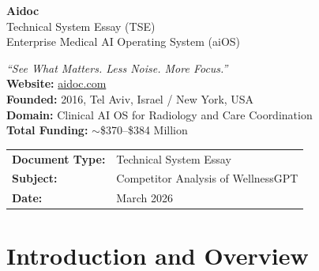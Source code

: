 \documentclass[12pt,a4paper]{article}
\begin{document}
\begin{titlepage}
    \centering\vspace*{2cm}
    {\Huge\bfseries\color{aidocblue} Aidoc}\\[0.5cm]
    {\Large\color{aidocteal} Technical System Essay (TSE)}\\[0.3cm]
    {\large\color{darkgray} Enterprise Medical AI Operating System (aiOS)}\\[2cm]
    \begin{mdframed}[backgroundcolor=lightgray,linecolor=aidocblue,linewidth=1.5pt,roundcorner=5pt]
        \centering\vspace{0.3cm}
        \textit{``See What Matters. Less Noise. More Focus.''}\\[0.3cm]
        \textbf{Website:} \href{https://aidoc.com}{aidoc.com}\\
        \textbf{Founded:} 2016, Tel Aviv, Israel / New York, USA\\
        \textbf{Domain:} Clinical AI OS for Radiology and Care Coordination\\
        \textbf{Total Funding:} $\sim$\$370--\$384 Million\\
        \vspace{0.3cm}
    \end{mdframed}
    \vspace{2cm}
    \begin{tabular}{ll}
        \textbf{Document Type:} & Technical System Essay \\
        \textbf{Subject:} & Competitor Analysis of WellnessGPT \\
        \textbf{Date:} & March 2026 \\
    \end{tabular}
\end{titlepage}

\tableofcontents\newpage

\begin{abstract}
\noindent This TSE analyses \textbf{Aidoc}, a clinical AI company that provides the \textbf{aiOS} --- an enterprise AI operating system for medical imaging and care coordination. Aidoc is analyzed here as a direct architectural competitor to WellnessGPT: both platforms brand themselves as ``AI Operating Systems'' for healthcare, but differ fundamentally in domain (imaging vs. workflow orchestration) and technical approach (discriminative detection vs. generative agentic AI).
\end{abstract}\newpage

\section{Introduction and Overview}
\end{document}
